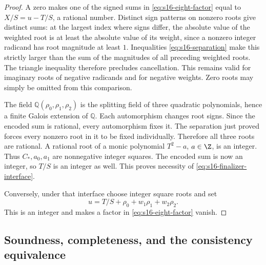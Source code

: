 \begin{proof}
A zero makes one of the signed sums in
\eqref{eq:s16-eight-factor} equal to \(X/S=u-T/S\), a rational number.
Distinct sign patterns on nonzero roots give distinct sums:
at the largest index where signs differ, the absolute value of the
weighted root is at least the absolute value of its weight, since a
nonzero integer radicand has root magnitude at least \(1\).
Inequalities \eqref{eq:s16-separation} make this strictly larger than
the sum of the magnitudes of all preceding weighted roots.
The triangle inequality therefore precludes cancellation.  This remains
valid for imaginary roots of negative radicands and for negative weights.
Zero roots may simply be omitted from this comparison.

The field \(\mathbb Q(\rho_0,\rho_1,\rho_2)\) is the splitting field of
three quadratic polynomials, hence a finite Galois extension of
\(\mathbb Q\).  Each automorphism changes root signs.
Since the encoded sum is rational, every automorphism fixes it.
The separation just proved forces every nonzero root in it to be fixed
individually.  Therefore all three roots are rational.
A rational root of a monic polynomial \(T^2-a\), \(a\in\Z\), is an
integer.  Thus \(C_*,a_0,a_1\) are nonnegative integer squares.
The encoded sum is now an integer, so \(T/S\) is an integer as well.
This proves necessity of \eqref{eq:s16-finalizer-interface}.

Conversely, under that interface choose integer square roots and set
\[
 u=T/S+\rho_0+w_1\rho_1+w_2\rho_2 .
\]
This is an integer and makes a factor in
\eqref{eq:s16-eight-factor} vanish.
\end{proof}

\subsection{Soundness, completeness, and the consistency equivalence}

